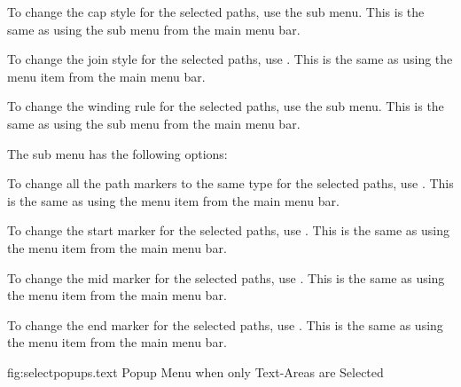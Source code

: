 
To change the cap style for the selected paths,
use the  sub menu. This is the same as using the
 sub menu from the main menu bar.


To change the join style for the selected paths,
use . This is the same as using the
 menu item from the main menu bar.

To change the winding rule for the selected paths,
use the  sub menu. This is the same as using the
 sub menu from the main menu bar.


The  sub menu has the following options:


To change all the path markers to the same type for the selected paths,
use . This is the same as using the
 menu item from the main menu bar.


To change the start marker for the selected paths,
use . This is the same as using the
 menu item from the main menu bar.


To change the mid marker for the selected paths,
use . This is the same as using the
 menu item from the main menu bar.


To change the end marker for the selected paths,
use . This is the same as using the
 menu item from the main menu bar.




\FloatFig
  {fig:selectpopups.text}
  {}
  {Popup Menu when only Text-Areas are Selected}


